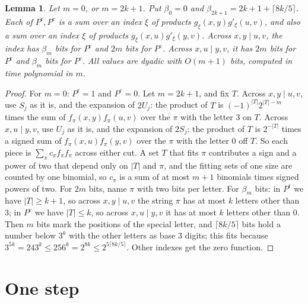 \documentclass[10pt]{article}
\newtheorem{lemma}{Lemma}
\begin{document}
\begin{lemma}\label{lem:seed}
Let $m=0$, or $m=2k+1$. Put $\beta_0=0$ and $\beta_{2k+1}=2k+1+\lceil8k/5\rceil$. Each of $P^{\mathrm r},P^{\mathrm c}$ is a sum over an index $\xi$ of products $g_\xi(x,y)g'_\xi(u,v)$, and also a sum over an index $\xi$ of products $g_\xi(x,u)g'_\xi(y,v)$. Across $x,y\mid u,v$, the index has $\beta_m$ bits for $P^{\mathrm r}$ and $2m$ bits for $P^{\mathrm c}$. Across $x,u\mid y,v$, it has $2m$ bits for $P^{\mathrm r}$ and $\beta_m$ bits for $P^{\mathrm c}$. All values are dyadic with $O(m+1)$ bits, computed in time polynomial in $m$.
\end{lemma}
\begin{proof}
For $m=0$: $P^{\mathrm r}=1$ and $P^{\mathrm c}=0$. Let $m=2k+1$, and fix $T$. Across $x,y\mid u,v$, use $S_j$ as it is, and the expansion of $2U_j$: the product of $T$ is $(-1)^{|T|}2^{|T|-m}$ times the sum of $f_\pi(x,y)f_\pi(u,v)$ over the $\pi$ with the letter $3$ on $T$. Across $x,u\mid y,v$, use $U_j$ as it is, and the expansion of $2S_j$: the product of $T$ is $2^{-|T|}$ times a signed sum of $f_\pi(x,u)f_\pi(y,v)$ over the $\pi$ with the letter $0$ off $T$. So each piece is $\sum_\pi c_\pi f_\pi f_\pi$ across either cut. A set $T$ that fits $\pi$ contributes a sign and a power of two that depend only on $|T|$ and $\pi$, and the fitting sets of one size are counted by one binomial, so $c_\pi$ is a sum of at most $m+1$ binomials times signed powers of two. For $2m$ bits, name $\pi$ with two bits per letter. For $\beta_m$ bits: in $P^{\mathrm r}$ we have $|T|\ge k+1$, so across $x,y\mid u,v$ the string $\pi$ has at most $k$ letters other than $3$; in $P^{\mathrm c}$ we have $|T|\le k$, so across $x,u\mid y,v$ it has at most $k$ letters other than $0$. Then $m$ bits mark the positions of the special letter, and $\lceil8k/5\rceil$ bits hold a number below $3^k$ with the other letters as base $3$ digits; this fits because $3^{5k}=243^k\le256^k=2^{8k}\le2^{5\lceil8k/5\rceil}$. Other indexes get the zero function.
\end{proof}

\section{One step}
\end{document}
